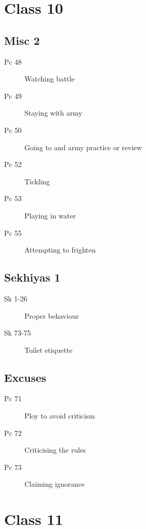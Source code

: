 \documentclass[11pt,oneside]{memoir}
\begin{document}
\clearpage

\chapter{Class 10}

\begin{multicols}{2}

\section{Misc 2}

\begin{description}
\item[Pc 48] Watching battle
\item[Pc 49] Staying with army
\item[Pc 50 \orig] Going to and army practice or review%
\item[Pc 52 \orig] Tickling%
\item[Pc 53] Playing in water
\item[Pc 55] Attempting to frighten
\end{description}

\columnbreak

\section{Sekhiyas 1}

\begin{description}
\item[Sk 1-26] Proper behaviour
\item[Sk 73-75] Toilet etiquette
\end{description}

\section{Excuses}

\begin{description}
\item[Pc 71] Ploy to avoid criticism
\item[Pc 72 \orig] Criticising the rules%
\item[Pc 73] Claiming ignorance
\end{description}

\end{multicols}

\chapter{Class 11}
\end{document}
